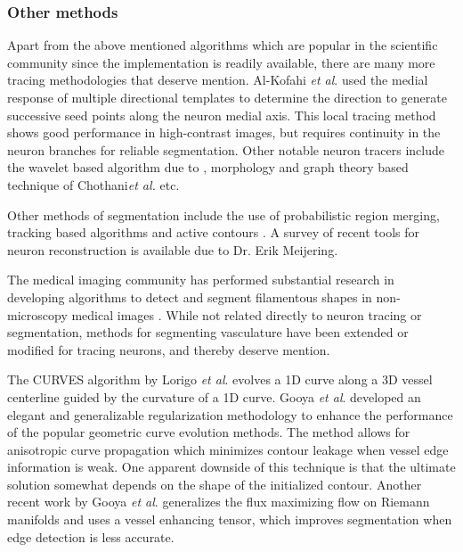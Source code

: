 \subsubsection{Other methods}
Apart from the above mentioned algorithms which are popular in the scientific community since the implementation is readily available, there are many more tracing methodologies that deserve mention. Al-Kofahi \textit{et al}. \cite{al_kofahi} used the medial response of multiple directional templates to determine the  direction to generate successive seed points along the neuron medial axis. This local tracing method shows good performance in high-contrast images, but requires continuity in the neuron branches for reliable segmentation. Other notable neuron tracers include the wavelet based algorithm due to \cite{dima_wavalet}, morphology and graph theory based technique of Chothani\textit{et al.} \cite{chothani2011automated} etc. 

Other methods of segmentation include the use of probabilistic region merging\cite{srinivasan2007automated},  tracking based algorithms \cite{wang2007dynamic,choromanska2012automatic} and active contours \cite{wang2011novel}. A survey of recent tools for neuron reconstruction is available due to Dr. Erik Meijering\cite{meijering_survey}.

The medical imaging community has performed substantial research in developing algorithms to detect and segment filamentous shapes in non-microscopy medical images \cite{lesage2009review}. While not related directly to neuron tracing or segmentation, methods for segmenting vasculature have been extended or modified for tracing neurons, and thereby deserve mention.

The CURVES algorithm by Lorigo \textit{et al}. \cite{lorigo2001curves} evolves a 1D curve along a 3D vessel centerline guided by the curvature of a 1D curve. Gooya \textit{et al}.\cite{gooya2008variational} developed an elegant and generalizable  regularization methodology to enhance the performance of the popular geometric curve evolution methods. The method allows for anisotropic curve propagation  which minimizes contour leakage when vessel edge information is weak. One apparent downside of this technique is that the ultimate solution somewhat depends on the shape of the initialized contour. Another recent work by Gooya \textit{et al}.\cite{gooya2012generalization} generalizes the flux maximizing flow \cite{flux_max} on Riemann manifolds and uses a vessel enhancing tensor, which improves segmentation when edge detection is less accurate.

